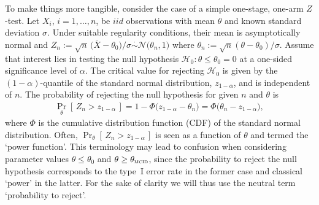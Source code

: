 \documentclass{article}
\renewcommand{\Pr}{\operatorname{Pr}}
\begin{document}
To make things more tangible, consider the case of a simple
one-stage, one-arm $Z$-test.
Let $X_i$, $i=1,\ldots,n$, be $iid$ observations with mean $\theta$ and known standard deviation $\sigma$.
Under suitable regularity conditions, their mean is asymptotically normal and
{\small $Z_n := \sqrt{n}\,\big(\overline{X} - \theta_0\big)/\sigma\stackrel{\cdot}{\sim}\mathcal{N}\big(\theta_n,1\big)$} where $\theta_n := \sqrt{n}(\theta - \theta_0)/\sigma$.
Assume that interest lies in testing the null hypothesis $\mathcal{H}_0:\theta \leq \theta_0 = 0$ at a one-sided significance level of $\alpha$.
\newcommand{\criticalvalue}{z_{1-\alpha}}
The critical value for rejecting $\mathcal{H}_0$ is given by the $(1-\alpha)$-quantile of the standard normal distribution, $\criticalvalue$, and is independent of $n$.
\newcommand{\mcid}{\theta_{\scaleto{\operatorname{MCID}}{3.5pt}}}
The probability of rejecting the null hypothesis for given $n$ and $\theta$ is
\begin{align}
\label{eq:prob-to-reject}
    \Pr_{\theta}[\,Z_n > \criticalvalue\,] = 1 - \Phi\big(\criticalvalue - \theta_n\big) = \Phi\big(\theta_n - \criticalvalue\big),
\end{align}
where $\Phi$ is the cumulative distribution function (CDF) of the standard normal distribution.
Often, $\Pr_{\theta}[\,Z_n > \criticalvalue\,]$ is seen as a function of $\theta$ and termed the `power function'.
This terminology may lead to confusion when considering parameter  values $\theta\leq\theta_0$ and $\theta\geq\mcid$, since the probability
to reject the null hypothesis corresponds to the type~I error rate in the former case and classical `power' in the latter.
For the sake of clarity we will thus use the neutral term `probability to reject'.
\end{document}
